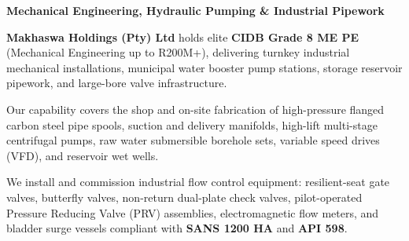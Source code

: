 \documentclass[a4paper,11pt]{article}
\begin{document}
\noindent
\begin{minipage}[t]{0.62\textwidth}
    \vspace{0pt}
    {\large\bfseries\color{mhnavy} Mechanical Engineering, Hydraulic Pumping \& Industrial Pipework}
    \vspace{0.12cm}

    {\fontsize{9pt}{13pt}\selectfont\color{mhtext}
    \textbf{Makhaswa Holdings (Pty) Ltd} holds elite \textbf{CIDB Grade 8 ME PE} (Mechanical Engineering up to R200M+), delivering turnkey industrial mechanical installations, municipal water booster pump stations, storage reservoir pipework, and large-bore valve infrastructure.
    }

    \vspace{0.22cm}

    {\fontsize{9pt}{13pt}\selectfont\color{mhtext}
    Our capability covers the shop and on-site fabrication of high-pressure flanged carbon steel pipe spools, suction and delivery manifolds, high-lift multi-stage centrifugal pumps, raw water submersible borehole sets, variable speed drives (VFD), and reservoir wet wells.
    }

    \vspace{0.22cm}

    {\fontsize{9pt}{13pt}\selectfont\color{mhtext}
    We install and commission industrial flow control equipment: resilient-seat gate valves, butterfly valves, non-return dual-plate check valves, pilot-operated Pressure Reducing Valve (PRV) assemblies, electromagnetic flow meters, and bladder surge vessels compliant with \textbf{SANS 1200 HA} and \textbf{API 598}.
    }
\end{minipage}
\hfill
\end{document}
